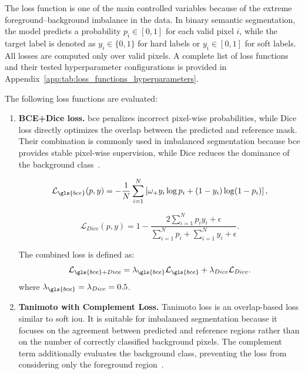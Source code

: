 The loss function is one of the main controlled variables because of the extreme foreground--background imbalance in the data. In binary semantic segmentation, the model predicts a probability $p_i \in [0,1]$ for each valid pixel $i$, while the target label is denoted as $y_i \in \{0,1\}$ for hard labels or $y_i \in [0,1]$ for soft labels. All losses are computed only over valid pixels. A complete list of loss functions and their tested hyperparameter configurations is provided in Appendix~\ref{app:tab:loss_functions_hyperparameters}.

The following loss functions are evaluated:
\begin{enumerate}
    \item \textbf{BCE+Dice loss.} \gls{bce} penalizes incorrect pixel-wise probabilities, while Dice loss directly optimizes the overlap between the predicted and reference mask. Their combination is commonly used in imbalanced segmentation because \gls{bce} provides stable pixel-wise supervision, while Dice reduces the dominance of the background class~\cite{yerram_extraction_2022,quan_improved_2021}.

    \begin{equation}
        \mathcal{L}_{\gls{bce}}(p,y) =
        - \frac{1}{N}\sum_{i=1}^{N}
        \left[
        \omega_{+} y_i \log p_i +
        (1-y_i)\log(1-p_i)
        \right],
    \end{equation}

    \begin{equation}
        \mathcal{L}_{Dice}(p,y) =
        1 -
        \frac{2\sum_{i=1}^{N}p_i y_i + \epsilon}
        {\sum_{i=1}^{N}p_i + \sum_{i=1}^{N}y_i + \epsilon}.
    \end{equation}

    The combined loss is defined as:
    \begin{equation}
        \mathcal{L}_{\gls{bce}+Dice}
        =
        \lambda_{\gls{bce}}\mathcal{L}_{\gls{bce}}
        +
        \lambda_{Dice}\mathcal{L}_{Dice}.
    \end{equation}
    where \(\lambda_{\gls{bce}} = \lambda_{Dice} = 0.5\).

    \item \textbf{Tanimoto with Complement Loss.} Tanimoto loss is an overlap-based loss similar to soft \gls{iou}. It is suitable for imbalanced segmentation because it focuses on the agreement between predicted and reference regions rather than on the number of correctly classified background pixels. The complement term additionally evaluates the background class, preventing the loss from considering only the foreground region~\cite{diakogiannis_resunet-_2020}.


\end{enumerate}
